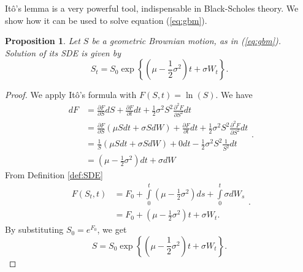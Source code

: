 \documentclass[a4paper,11pt, twoside]{book}
\newtheorem{prop}[thm]{Proposition}
\theoremstyle{definition}
\theoremstyle{remark}
\begin{document}
It\^{o}'s lemma is a very powerful tool, indispensable in Black-Scholes theory. We show how it can be used to solve equation (\ref{eq:gbm}).
\begin{prop}
\label{prop:solution_dynamics}
 Let $S$ be a geometric Brownian motion, as in (\ref{eq:gbm}).
 Solution of its SDE is given by
 \begin{equation}
  \label{eq:gmb_sol}
  S_t = S_0 \exp\left\{ (\mu - \frac{1}{2}\sigma^2)t + \sigma W_t \right\}.
 \end{equation}
\end{prop}
\begin{proof}
We apply It\^{o}'s formula with $F(S,t) = \ln(S)$. We have
 \begin{equation*}
  \begin{split}
   dF &= \frac{\partial F}{\partial S}dS + \frac{\partial F}{\partial t}dt + \frac{1}{2}\sigma^2 S^2 \frac{\partial^2 F}{\partial S^2}dt \\
   &= \frac{\partial F}{\partial S}(\mu S dt + \sigma S dW) + \frac{\partial F}{\partial t}dt + \frac{1}{2}\sigma^2 S^2 \frac{\partial^2 F}{\partial S^2}dt \\    
   &= \frac{1}{S}(\mu S dt + \sigma S dW) + 0dt - \frac{1}{2}\sigma^2 S^2 \frac{1}{S^2}dt \\   
   &= (\mu - \frac{1}{2}\sigma^2) dt + \sigma dW
  \end{split}.
 \end{equation*}
 From Definition \ref{def:SDE}
 \begin{equation*}
  \begin{split}
  F(S_t,t) &= F_0 + \int\limits_0^t (\mu - \frac{1}{2}\sigma^2) ds + \int\limits_0^t \sigma dW_s\\
  &= F_0 + (\mu - \frac{1}{2}\sigma^2)t +  \sigma W_t. 
  \end{split}.
 \end{equation*}
 By substituting $S_0 = e^{F_0}$, we get
 \[ S = S_0 \exp\left\{ (\mu - \frac{1}{2}\sigma^2)t + \sigma W_t \right\}. \] 
\end{proof}
\end{document}
